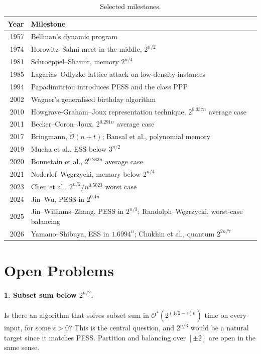 \documentclass[11pt]{article}
\newcommand{\Oh}{\mathcal{O}}
\newcommand{\Ot}{\tilde{\mathcal{O}}}
\begin{document}
\begin{table}[t]
\centering
\caption{Selected milestones.}
\label{tab:chron}
\small
\begin{tabular}{rp{11cm}}
\toprule
Year & Milestone \\
\midrule
1957 & Bellman's dynamic program \\
1974 & Horowitz--Sahni meet-in-the-middle, $2^{n/2}$ \\
1981 & Schroeppel--Shamir, memory $2^{n/4}$ \\
1985 & Lagarias--Odlyzko lattice attack on low-density instances \\
1994 & Papadimitriou introduces PESS and the class PPP \\
2002 & Wagner's generalised birthday algorithm \\
2010 & Howgrave-Graham--Joux representation technique, $2^{0.337n}$ average case \\
2011 & Becker--Coron--Joux, $2^{0.291n}$ average case \\
2017 & Bringmann, $\Ot(n+t)$; Bansal et al., polynomial memory \\
2019 & Mucha et al., ESS below $3^{n/2}$ \\
2020 & Bonnetain et al., $2^{0.283n}$ average case \\
2021 & Nederlof--W\k{e}grzycki, memory below $2^{n/4}$ \\
2023 & Chen et al., $2^{n/2}/n^{0.5023}$ worst case \\
2024 & Jin--Wu, PESS in $2^{0.4n}$ \\
2025 & Jin--Williams--Zhang, PESS in $2^{n/3}$; Randolph--W\k{e}grzycki, worst-case balancing \\
2026 & Yamano--Shibuya, ESS in $1.6994^n$; Chukhin et al., quantum $2^{2n/7}$ \\
\bottomrule
\end{tabular}
\end{table}

\section{Open Problems}\label{sec:frontier}

\paragraph{1. Subset sum below $2^{n/2}$.}
Is there an algorithm that solves subset sum in $\Oh^*(2^{(1/2-\epsilon)n})$
time on every input, for some $\epsilon>0$? This is the central question, and
$2^{n/3}$ would be a natural target since it matches PESS. Partition and
balancing over $[\pm2]$ are open in the same sense.
\end{document}

